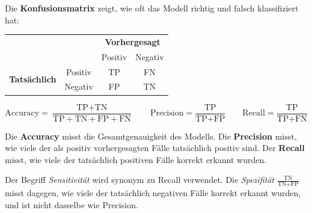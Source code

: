 \begin{mydefinition}[Konfusionsmatrix]
    Die \textbf{Konfusionsmatrix} zeigt, wie oft das Modell richtig und falsch klassifiziert hat:

    \begin{center}
        \begin{tabular}{cccc}
                                                  &         & \multicolumn{2}{c}{\textbf{Vorhergesagt}} \\
                                                  &         & Positiv                                      & Negativ \\
            \midrule
            \multirow{2}{*}{\textbf{Tatsächlich}} & Positiv & TP                                           & FN \\
                                                  & Negativ & FP                                           & TN \\
        \end{tabular}
    \end{center}
\end{mydefinition}

\begin{mydefinition}
    \[
        \text{Accuracy} = \frac{\text{TP} + \text{TN}}{\text{TP} + \text{TN} + \text{FP} + \text{FN}}
        \qquad
        \text{Precision} = \frac{\text{TP}}{\text{TP} + \text{FP}}
        \qquad
        \text{Recall} = \frac{\text{TP}}{\text{TP} + \text{FN}}
    \]

    Die \textbf{Accuracy} misst die Gesamtgenauigkeit des Modells.
    Die \textbf{Precision} misst, wie viele der als positiv vorhergesagten Fälle tatsächlich positiv sind.
    Der \textbf{Recall} misst, wie viele der tatsächlich positiven Fälle korrekt erkannt wurden.

    Der Begriff \emph{Sensitivität} wird synonym zu Recall verwendet. Die \emph{Spezifität} $\frac{\text{TN}}{\text{TN} + \text{FP}}$ misst dagegen, wie viele der tatsächlich negativen Fälle korrekt erkannt wurden, und ist nicht dasselbe wie Precision.
\end{mydefinition}

